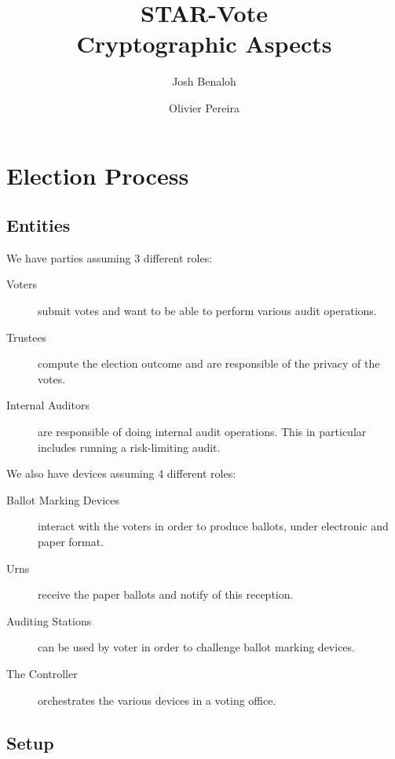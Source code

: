 \documentclass[prodmode]{acmsmall}
\title{STAR-Vote\\ Cryptographic Aspects}
\author{Josh Benaloh\affil{Microsoft Research} \and Olivier Pereira\affil{Universit{\'e} catholique de Louvain}}
\begin{document}
\maketitle
\section{Election Process}
\label{sec:election-process}

\subsection{Entities}

We have parties assuming 3 different roles:
\begin{description}
\item[Voters] submit votes and want to be able to perform various audit operations. 
\item[Trustees] compute the election outcome and are responsible
  of the privacy of the votes.
\item[Internal Auditors] are responsible of doing internal audit
  operations. This in particular includes running a risk-limiting
  audit.
\end{description}

We also have devices assuming 4 different roles:
\begin{description}
\item[Ballot Marking Devices] interact with the voters in order
  to produce ballots, under electronic and paper format.
\item[Urns] receive the paper ballots and notify of this
  reception.
\item[Auditing Stations] can be used by voter in order to challenge
  ballot marking devices.
\item[The Controller] orchestrates the various devices in a voting
  office. 
\end{description}


\subsection{Setup}
\label{sec:setup}
\end{document}

